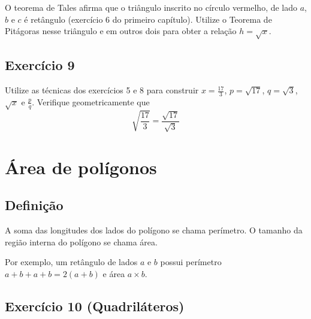 O teorema de Tales afirma que o triângulo inscrito no círculo vermelho, de lado
$a$, $b$ e $c$ é retângulo (exercício 6 do primeiro capítulo). Utilize o Teorema
de Pitágoras nesse triângulo e em outros dois para obter a relação $h = \sqrt{x}$.

\subsection*{Exercício 9}

Utilize as técnicas dos exercícios 5 e 8 para construir
$x = \frac{17}{3}$, $p = \sqrt{17}$, $q = \sqrt{3}$, $\sqrt{x}$ e $\frac{p}{q}$.
Verifique geometricamente que
$$
\sqrt{\frac{17}{3}} = \frac{\sqrt{17}}{\sqrt{3}}
$$

\section{Área de polígonos}

\subsection*{Definição}

A soma das longitudes dos lados do polígono se chama perímetro. O tamanho da
região interna do polígono se chama área.

Por exemplo, um retângulo de lados $a$ e $b$ possui perímetro
$a+b+a+b=2{(a+b)}$ e área $a \times b$.

\begin{center}
\end{center}

\subsection*{Exercício 10 (Quadriláteros)}

